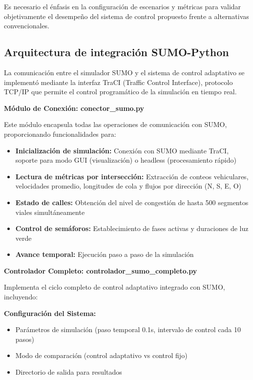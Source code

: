 \documentclass[12pt,a4paper,oneside]{report}
\begin{document}
Es necesario el énfasis en la configuración de escenarios y métricas para validar objetivamente el desempeño del sistema de control propuesto frente a alternativas convencionales.

\subsection{Arquitectura de integración SUMO-Python}\label{arquitectura-de-integraciuxf3n-sumo-python}

La comunicación entre el simulador SUMO y el sistema de control adaptativo se implementó mediante la interfaz TraCI (Traffic Control Interface), protocolo TCP/IP que permite el control programático de la simulación en tiempo real.

\textbf{Módulo de Conexión: conector\_sumo.py}

Este módulo encapsula todas las operaciones de comunicación con SUMO, proporcionando funcionalidades para:

\begin{itemize}
\item
  \textbf{Inicialización de simulación:} Conexión con SUMO mediante TraCI, soporte para modo GUI (visualización) o headless (procesamiento rápido)
\item
  \textbf{Lectura de métricas por intersección:} Extracción de conteos vehiculares, velocidades promedio, longitudes de cola y flujos por dirección (N, S, E, O)
\item
  \textbf{Estado de calles:} Obtención del nivel de congestión de hasta 500 segmentos viales simultáneamente
\item
  \textbf{Control de semáforos:} Establecimiento de fases activas y duraciones de luz verde
\item
  \textbf{Avance temporal:} Ejecución paso a paso de la simulación
\end{itemize}

\textbf{Controlador Completo: controlador\_sumo\_completo.py}

Implementa el ciclo completo de control adaptativo integrado con SUMO, incluyendo:

\textbf{Configuración del Sistema:}

\begin{itemize}
\item
  Parámetros de simulación (paso temporal 0.1s, intervalo de control cada 10 pasos)
\item
  Modo de comparación (control adaptativo vs control fijo)
\item
  Directorio de salida para resultados
\end{itemize}
\end{document}
